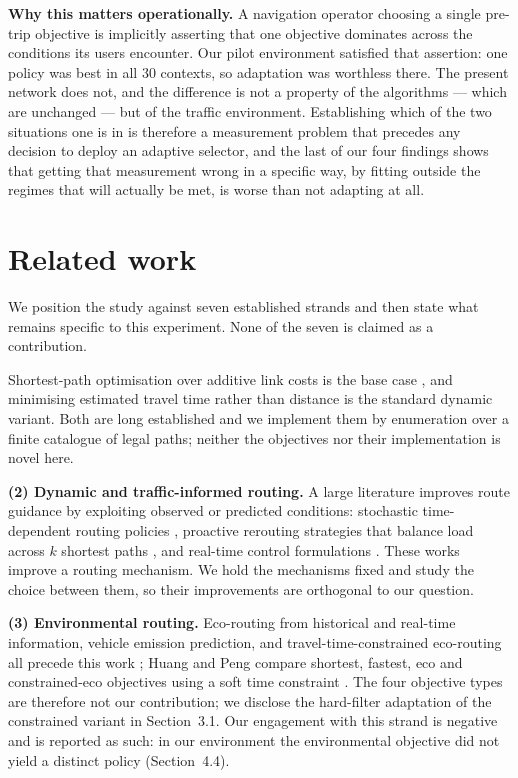 \documentclass[10pt,a4paper]{article}
\begin{document}
\textbf{Why this matters operationally.} A navigation operator choosing a single pre-trip objective is implicitly asserting that one objective dominates across the conditions its users encounter. Our pilot environment satisfied that assertion: one policy was best in all 30 contexts, so adaptation was worthless there. The present network does not, and the difference is not a property of the algorithms --- which are unchanged --- but of the traffic environment. Establishing which of the two situations one is in is therefore a measurement problem that precedes any decision to deploy an adaptive selector, and the last of our four findings shows that getting that measurement wrong in a specific way, by fitting outside the regimes that will actually be met, is worse than not adapting at all.

\section{Related work}
We position the study against seven established strands and then state what remains specific to this experiment. None of the seven is claimed as a contribution.

Shortest-path optimisation over additive link costs is the base case \cite{R01}, and minimising estimated travel time rather than distance is the standard dynamic variant. Both are long established and we implement them by enumeration over a finite catalogue of legal paths; neither the objectives nor their implementation is novel here.

\textbf{(2) Dynamic and traffic-informed routing.} A large literature improves route guidance by exploiting observed or predicted conditions: stochastic time-dependent routing policies \cite{R07,R46}, proactive rerouting strategies that balance load across $k$ shortest paths \cite{R47}, and real-time control formulations \cite{R48}. These works improve a routing mechanism. We hold the mechanisms fixed and study the choice between them, so their improvements are orthogonal to our question.

\textbf{(3) Environmental routing.} Eco-routing from historical and real-time information, vehicle emission prediction, and travel-time-constrained eco-routing all precede this work \cite{R03,R40,R04}; Huang and Peng compare shortest, fastest, eco and constrained-eco objectives using a soft time constraint \cite{R05}. The four objective types are therefore not our contribution; we disclose the hard-filter adaptation of the constrained variant in Section~3.1. Our engagement with this strand is negative and is reported as such: in our environment the environmental objective did not yield a distinct policy (Section~4.4).
\end{document}
